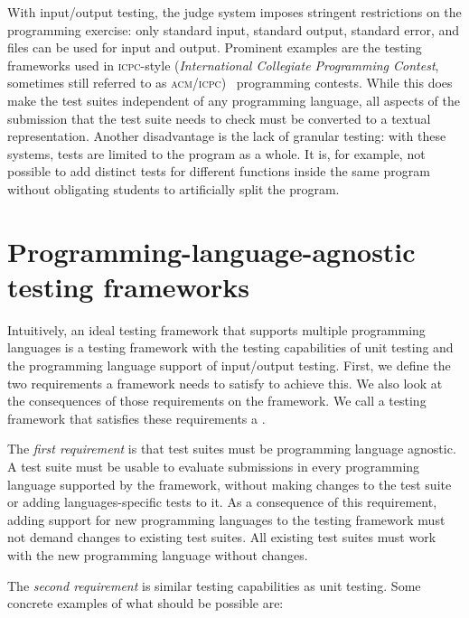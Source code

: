 \documentclass[../main]{subfiles}
\begin{document}
With input/output testing, the judge system imposes stringent restrictions on the programming exercise: only standard input, standard output, standard error, and files can be used for input and output.
Prominent examples are the testing frameworks used in \textsc{icpc}-style (\emph{International Collegiate Programming Contest}, sometimes still referred to as \textsc{acm/icpc})~\autocite{ICPCFactSheet2023} programming contests.
While this does make the test suites independent of any programming language, all aspects of the submission that the test suite needs to check must be converted to a textual representation.
Another disadvantage is the lack of granular testing: with these systems, tests are limited to the program as a whole.
It is, for example, not possible to add distinct tests for different functions inside the same program without obligating students to artificially split the program.

\section{Programming-language-agnostic testing frameworks}\label{sec:tested1-programming-language-agnostic-test-frameworks}

Intuitively, an ideal testing framework that supports multiple programming languages is a testing framework with the testing capabilities of unit testing and the programming language support of input/output testing.
First, we define the two requirements a framework needs to satisfy to achieve this.
We also look at the consequences of those requirements on the framework.
We call a testing framework that satisfies these requirements a .

The \emph{first requirement} is that test suites must be programming language agnostic.
A test suite must be usable to evaluate submissions in every programming language supported by the framework, without making changes to the test suite or adding languages-specific tests to it.
As a consequence of this requirement, adding support for new programming languages to the testing framework must not demand changes to existing test suites.
All existing test suites must work with the new programming language without changes.

The \emph{second requirement} is similar testing capabilities as unit testing.
Some concrete examples of what should be possible are:
\end{document}
